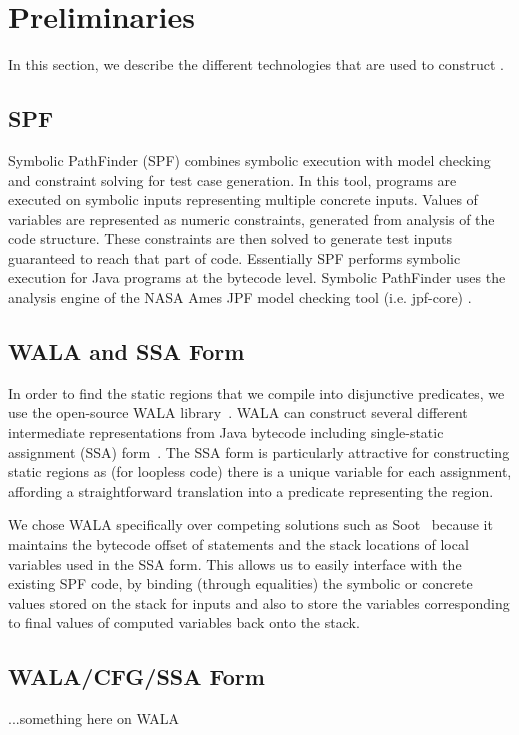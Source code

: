 \section{Preliminaries}

In this section, we describe the different technologies that are used to construct \tool.  

\subsection{SPF}
Symbolic PathFinder (SPF) \cite{spf} combines symbolic execution with model checking and constraint solving for test case generation. In this tool, programs are executed on symbolic inputs representing multiple concrete inputs. Values of variables are represented as numeric constraints, generated from analysis of the code structure. These constraints are then solved to generate test inputs guaranteed to reach that part of code. Essentially SPF performs symbolic execution for Java programs at the bytecode level. Symbolic PathFinder uses the analysis engine of the NASA Ames JPF model checking tool (i.e. jpf-core) \cite{jpf}.


\subsection{WALA and SSA Form}
In order to find the static regions that we compile into disjunctive predicates, we use the open-source WALA library~\cite{}.  WALA can construct several different intermediate representations from Java bytecode including single-static assignment (SSA) form~\cite{}.  The SSA form is particularly attractive for constructing static regions as (for loopless code) there is a unique variable for each assignment, affording a straightforward translation into a predicate representing the region.  

We chose WALA specifically over competing solutions such as Soot~\cite{} because it maintains the bytecode offset of statements and the stack locations of local variables used in the SSA form.  This allows us to easily interface with the existing SPF code, by binding (through equalities) the symbolic or concrete values stored on the stack for inputs and also to store the variables corresponding to final values of computed variables back onto the stack.

\iffalse
\subsection{WALA/CFG/SSA Form}
...something here on WALA

